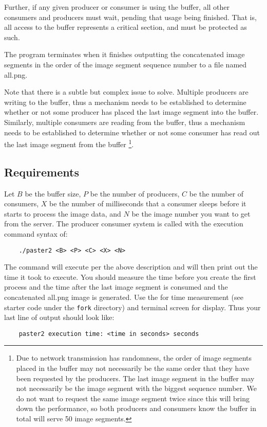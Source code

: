 Further, if any given producer or consumer is using the buffer, all other consumers and producers must wait, pending that usage being finished.  That is, all access to the buffer represents a critical section, and must be protected as such.

The program terminates when it finishes outputting the concatenated image segments in the order of the image segment sequence number to a file named all.png.

Note that there is a subtle but complex issue to solve. Multiple producers are writing to the buffer, thus a mechanism needs to be established to determine whether or not some producer has placed the last image segment into the buffer. Similarly, multiple consumers are reading from the buffer, thus a mechanism needs to be established to determine whether or not some consumer has read out the last image segment from the buffer
\footnote{Due to network transmission has randomness, the order of image segments placed in the buffer may not necessarily be the same order that they have been requested by the producers. The last image segment in the buffer may not necessarily be the image segment with the biggest sequence number. We do not want to request the same image segment twice since this will bring down the performance, so both producers and consumers know the buffer in total will serve 50 image segments.}. 

\subsection*{Requirements}

Let
$B$ be the buffer size,  
$P$ be the number of producers,
$C$ be the number of consumers,
$X$ be the number of milliseconds that a consumer sleeps before it starts to process the image data, and
$N$ be the image number you want to get from the server.
The producer consumer system is called with the execution command syntax of:
\begin{verbatim}
    ./paster2 <B> <P> <C> <X> <N>
\end{verbatim}

The command will execute per the above description and will then print out the time it took to execute. You should measure the time before you create the first process and the time after the last image segment is consumed and the concatenated all.png image is generated. Use the  for time measurement (see starter code under the \verb+fork+ directory) and terminal screen for display. 
Thus your last line of output should look like:
\begin{verbatim}
    paster2 execution time: <time in seconds> seconds
\end{verbatim}


